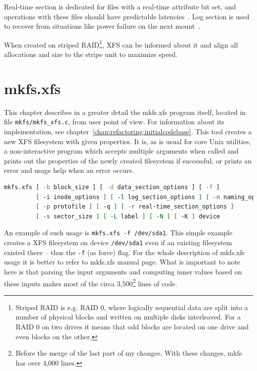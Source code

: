 Real-time section is dedicated for files with a real-time attribute bit set, and operations with these files should have predictable latencies~\cite{xfsRealtime}. Log section is used to recover from situations like power failure on the next mount~\cite{xfsStructure,xfsman}.

When created on striped RAID\footnote{Striped RAID is e.g. RAID 0, where logically sequential data are split into a number of physical blocks and written on multiple disks interleaved. For a RAID 0 on two drives it means that odd blocks are located on one drive and even blocks on the other.}, XFS can be informed about it and align all allocations and size to the stripe unit to maximize speed.


\section{mkfs.xfs}\label{chap:xfs:mkfs}

This chapter describes in a greater detail the mkfs.xfs program itself, located
in file {\tt mkfs/mkfs\_xfs.c}, from user point of view. For information about
its implementation, see chapter~\ref{chap:refactoring:initialcodebase}. This
tool creates a new XFS filesystem with given properties. It is, as is usual for
core Unix utilities, a non-interactive program which accepts multiple arguments
when called and prints out the properties of the newly created filesystem if
successful, or prints an error and usage help when an error occurs.

\begin{lstlisting}[frame=none, basicstyle=\footnotesize\ttfamily, language=Bash, numbers=none, numberstyle=\tiny\color{black},caption= {Synopsis of mkfs.xfs utility~\cite{mkfs.xfsMan}.}]
mkfs.xfs [ -b block_size ] [ -d data_section_options ] [ -f ]
         [ -i inode_options ] [ -l log_section_options ] [ -n naming_options ]
         [ -p protofile ] [ -q ] [ -r real-time_section_options ]
         [ -s sector_size ] [ -L label ] [ -N ] [ -K ] device
\end{lstlisting}

An example of such usage is {\tt mkfs.xfs -f /dev/sda1}. This simple example creates a XFS filesystem on device {\tt /dev/sda1} even if an existing filesystem existed there -- thus the {\tt -f} (as force) flag. For the whole description of mkfs.xfs usage it is better to refer to mkfs.xfs manual page. What is important to note here is that parsing the input arguments and computing inner values based on these inputs makes most of the circa 3,500\footnote{Before the merge of the last part of my changes. With these changes, mkfs has over 4,000 lines.} lines of code.

